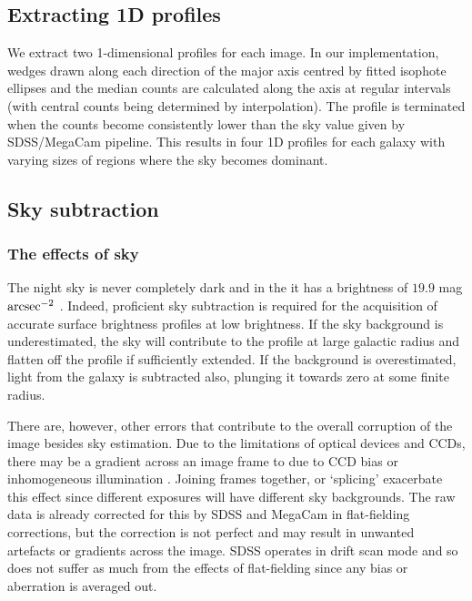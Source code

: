 \subsection{Extracting 1D profiles}
We extract two 1-dimensional profiles for each image. In our implementation, wedges drawn along each direction of the major axis centred by fitted isophote ellipses and the median counts are calculated along the axis at regular intervals (with central counts being determined by interpolation). The profile is terminated when the counts become consistently lower than the sky value given by SDSS/MegaCam pipeline. This results in four 1D profiles for each galaxy with varying sizes of regions where the sky becomes dominant. 

\subsection{Sky subtraction}
\subsubsection{The effects of sky}
The night sky is never completely dark and in the \iband it has a brightness of $19.9$ mag $\rm{arcsec}^{-2}$ \citep{binney_galactic_1998}. Indeed, proficient sky subtraction is required for the acquisition of accurate surface brightness profiles at low brightness. If the sky background is underestimated, the sky will contribute to the profile at large galactic radius and flatten off the profile if sufficiently extended. If the background is overestimated, light from the galaxy is subtracted also, plunging it towards zero at some finite radius. 
\begin{figure}
	\label{fig: effects of sky from binney}
\end{figure}
There are, however, other errors that contribute to the overall corruption of the image besides sky estimation. Due to the limitations of optical devices and CCDs, there may be a gradient across an image frame to due to CCD bias or inhomogeneous illumination \citep{olsen_radiometric_2010}. Joining frames together, or `splicing' exacerbate this effect since different exposures will have different sky backgrounds. The raw data is already corrected for this by SDSS and MegaCam in flat-fielding corrections, but the correction is not perfect and may result in unwanted artefacts or gradients across the image. SDSS operates in drift scan mode \citep{abazajian_seventh_2009} and so does not suffer as much from the effects of flat-fielding since any bias or aberration is averaged out.

